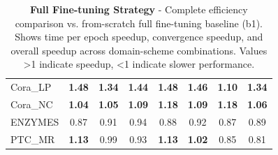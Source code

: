 \documentclass[11pt]{article}
\begin{document}
\begin{table}[t]
\begin{tabular}{l c c c c c c c}
Cora\_LP & \textbf{1.48} & \textbf{1.34} & \textbf{1.44} & \textbf{1.48} & \textbf{1.46} & \textbf{1.10} & \textbf{1.34} \\
Cora\_NC & \textbf{1.04} & \textbf{1.05} & \textbf{1.09} & \textbf{1.18} & \textbf{1.09} & \textbf{1.18} & \textbf{1.06} \\
ENZYMES & 0.87 & 0.91 & 0.94 & 0.88 & 0.92 & 0.87 & 0.89 \\
PTC\_MR & \textbf{1.13} & 0.99 & 0.93 & \textbf{1.13} & \textbf{1.02} & 0.85 & 0.81 \\
\bottomrule
\end{tabular}
\caption{\textbf{Full Fine-tuning Strategy} - Complete efficiency comparison vs. from-scratch full fine-tuning baseline (b1). Shows time per epoch speedup, convergence speedup, and overall speedup across domain-scheme combinations. Values >1 indicate speedup, <1 indicate slower performance.}
\label{tab:full-finetuning}
\end{table}
\end{document}
